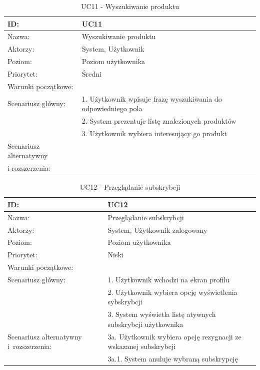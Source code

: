 \begin{table}[H]
    \begin{tabular}{|p{5cm}|p{9cm}|}\hline
    ID: & UC11 \\\hline
    Nazwa: & Wyszukiwanie produktu \\\hline
    Aktorzy: & System, Użytkownik \\\hline
    Poziom: & Poziom użytkownika  \\\hline
    Priorytet: & Średni \\\hline
    Warunki początkowe: & ~ \\\hline
    Scenariusz główny: & 1. Użytkownik wpisuje frazę wyszukiwania do odpowiedniego pola \\
    ~ & 2. System prezentuje listę znalezionych produktów \\
    ~ & 3. Użytkownik wybiera interesujący go produkt \\\hline
	Scenariusz alternatywny & ~ \\
	i rozszerzenia: & ~ \\
    \hline\end{tabular}
	\caption{UC11 - Wyszukiwanie produktu}
\end{table}
\newpage
\begin{table}[H]
    \begin{tabular}{|p{5cm}|p{9cm}|}\hline
    ID: & UC12 \\\hline
    Nazwa: & Przeglądanie subskrybcji \\\hline
    Aktorzy: & System, Użytkownik zalogowany \\\hline
    Poziom: & Poziom użytkownika  \\\hline
    Priorytet: & Niski \\\hline
    Warunki początkowe: & ~ \\\hline
    Scenariusz główny: & 1. Użytkownik wchodzi na ekran profilu \\
    ~ & 2. Użytkownik wybiera opcję wyświetlenia sybskrybcji \\
    ~ & 3. System wyświetla listę atywnych subskrybcji użytkownika \\\hline
    Scenariusz alternatywny i~rozszerzenia:& 3a. Użytkownik wybiera opcję rezygnacji ze wskazanej subskrybcji \\
    ~ & 3a.1. System anuluje wybraną subskrypcję \\
    \hline\end{tabular}
	\caption{UC12 - Przeglądanie subskrybcji}
\end{table}

